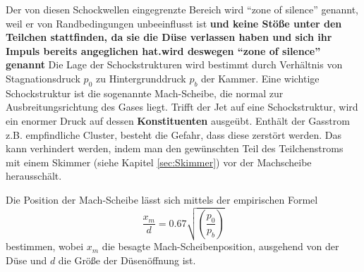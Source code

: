 % 
Der von diesen Schockwellen eingegrenzte Bereich wird \enquote{zone of silence} genannt, weil er von Randbedingungen unbeeinflusst ist \textbf{und keine Stöße unter den Teilchen stattfinden, da sie die Düse verlassen haben und sich ihr Impuls bereits angeglichen hat.wird deswegen \enquote{zone of silence} genannt}
Die Lage der Schockstrukturen wird bestimmt durch Verhältnis von Stagnationsdruck $p_0$ zu Hintergrunddruck $p_b$ der Kammer. Eine wichtige Schockstruktur ist die sogenannte Mach-Scheibe, die normal zur Ausbreitungsrichtung des Gases liegt. Trifft der Jet auf eine Schockstruktur, wird ein enormer Druck auf dessen \textbf{Konstituenten} ausgeübt. Enthält der Gasstrom z.B. empfindliche Cluster, besteht die Gefahr, dass diese zerstört werden. Das kann verhindert werden, indem man den gewünschten Teil des Teilchenstroms mit einem Skimmer (siehe Kapitel \ref{sec:Skimmer}) vor der Machscheibe herausschält.

Die Position der Mach-Scheibe lässt sich mittels der empirischen Formel
\begin{equation} \label{eq:Machscheibe}
\frac{x_m}{d}=0.67 \sqrt{\left( \frac{p_0}{p_b}\right)}
\end{equation}
%
bestimmen, wobei $x_m$ die besagte Mach-Scheibenposition, ausgehend von der Düse und $d$ die Größe der Düsenöffnung ist.




